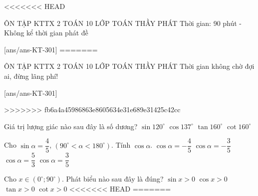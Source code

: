<<<<<<< HEAD
\begin{name}
	{ÔN TẬP KTTX 2}
	{TOÁN 10}
	{LỚP TOÁN THẦY PHÁT}
	{Thời gian: 90 phút - Không kể thời gian phát đề}
\end{name}
\TN
\setcounter{ex}{0}\setcounter{ex}{0}
[ans/ans-KT-301]
=======
\def\tenchude{ÔN TẬP KTTX 2}
\begin{name}
	{\tenchude}
	{TOÁN 10}
	{LỚP TOÁN THẦY PHÁT}
	{Thời gian không chờ đợi ai, đừng lãng phí!}
\end{name}

\setcounter{ex}{0}\setcounter{ex}{0}
[ans/ans-KT-301]

>>>>>>> fb6a4a45986863e8605634e31e689e31425c42cc
\begin{ex}
	Giá trị lượng giác nào sau đây là số dương?
	\choice
	{\True $\sin 120^\circ$}
	{$\cos 137^\circ$}
	{$\tan 160^\circ$}
	{$\cot 160^\circ$}
\end{ex}

\begin{ex}
	Cho $\sin\alpha=\dfrac{4}{5}$, $\left(90^\circ<\alpha <180^\circ\right)$. Tính $\cos\alpha $.
	\choice
	{$\cos\alpha=-\dfrac{4}{5}$}
	{\True $\cos\alpha=-\dfrac{3}{5}$}
	{$\cos\alpha=\dfrac{5}{3}$}
	{$\cos\alpha=\dfrac{3}{5}$}
\end{ex}

\begin{ex}
	Cho $x\in\left(0^\circ;90^\circ\right)$. Phát biểu nào sau đây là đúng?
	\choice
	{\True $\sin x>0$}
	{$\cos x>0$}
	{$\tan x>0$}
	{$\cot x>0$}
<<<<<<< HEAD
=======
\end{ex}

